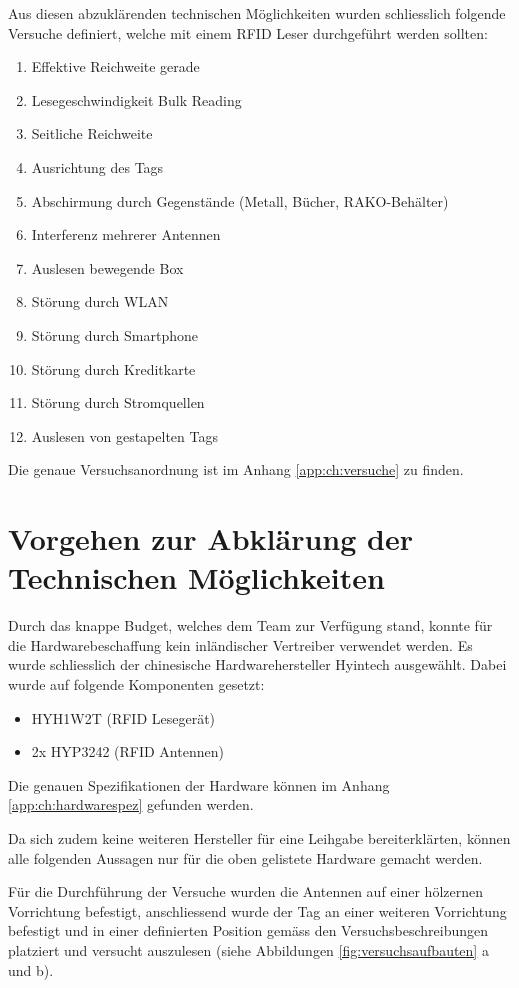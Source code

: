 Aus diesen abzuklärenden technischen Möglichkeiten wurden schliesslich folgende Versuche definiert, welche mit einem RFID Leser durchgeführt werden sollten:
\begin{enumerate}
	\item Effektive Reichweite gerade
	\item Lesegeschwindigkeit Bulk Reading
	\item Seitliche Reichweite
	\item Ausrichtung des Tags
	\item Abschirmung durch Gegenstände (Metall, Bücher, RAKO-Behälter)
	\item Interferenz mehrerer Antennen
	\item Auslesen bewegende Box
	\item Störung durch WLAN
	\item Störung durch Smartphone
	\item Störung durch Kreditkarte
	\item Störung durch Stromquellen
	\item Auslesen von gestapelten Tags
\end{enumerate}

Die genaue Versuchsanordnung ist im Anhang \ref{app:ch:versuche} zu finden.

\section{Vorgehen zur Abklärung der Technischen Möglichkeiten}

Durch das knappe Budget, welches dem Team zur Verfügung stand, konnte für die Hardwarebeschaffung kein inländischer Vertreiber verwendet werden. Es wurde schliesslich der chinesische Hardwarehersteller Hyintech ausgewählt. Dabei wurde auf folgende Komponenten gesetzt:

\begin{itemize}
	\item HYH1W2T (RFID Lesegerät)
	\item 2x HYP3242 (RFID Antennen)
\end{itemize}

Die genauen Spezifikationen der Hardware können im Anhang \ref{app:ch:hardwarespez} gefunden werden.

Da sich zudem keine weiteren Hersteller für eine Leihgabe bereiterklärten, können alle folgenden Aussagen nur für die oben gelistete Hardware gemacht werden.

Für die Durchführung der Versuche wurden die Antennen auf einer hölzernen Vorrichtung befestigt, anschliessend wurde der Tag an einer weiteren Vorrichtung befestigt und in einer definierten Position gemäss den Versuchsbeschreibungen platziert und versucht auszulesen (siehe Abbildungen \ref{fig:versuchsaufbauten} a und b).

